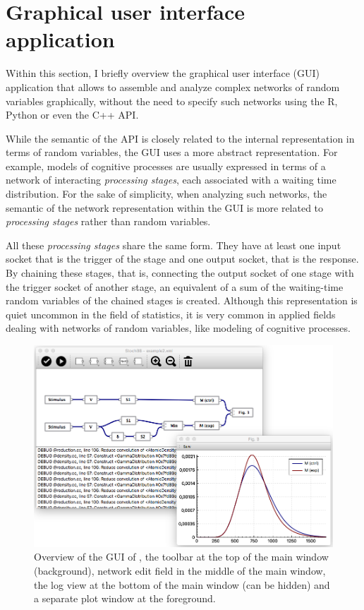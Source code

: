 \section{Graphical user interface application} \label{sec:gui}
Within this section, I briefly overview the graphical user interface (GUI) application that allows to assemble and analyze complex networks of random variables graphically, without the need to specify such networks  using the R, Python or even the C++ API. 

While the semantic of the  API is closely related to the internal representation in terms of random variables, the GUI uses a more abstract representation. For example, models of cognitive processes are usually expressed in terms of a network of interacting \emph{processing stages}, each associated with a waiting time distribution. For the sake of simplicity, when analyzing such networks, the semantic of the network representation within the GUI is more related to \emph{processing stages} rather than random variables. 

All these \emph{processing stages} share the same form. They have at least one input socket that is the trigger of the stage and one output socket, that is the response. By chaining these stages, that is, connecting the output socket of one stage with the trigger socket of another stage, an equivalent of a sum of the waiting-time random variables of the chained stages is created. Although this representation is quiet uncommon in the field of statistics, it is very common in applied fields dealing with networks of random variables, like modeling of cognitive processes.

\begin{figure}[!ht]
 \centering
 \includegraphics[width=.75\textwidth]{fig/GUI2.png}
 \caption{Overview of the GUI of , the toolbar at the top of the main window (background), network edit field in the middle of the main window, the log view at the bottom of the main window (can be hidden) and a separate plot window at the foreground.} \label{fig:gui}
\end{figure}

